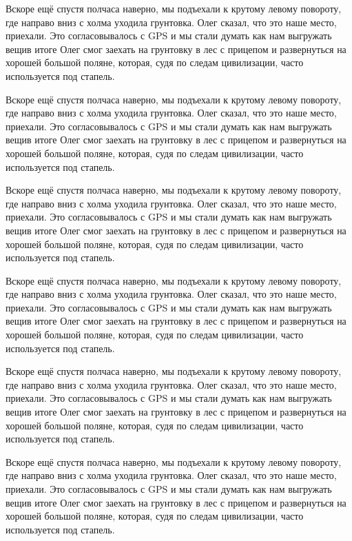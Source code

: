 Вскоре ещё спустя полчаса наверно, мы подъехали к крутому левому повороту, где направо вниз с холма уходила грунтовка. Олег сказал, что это наше место, приехали. Это согласовывалось с GPS и мы стали думать как нам выгружать вещи\mdash в итоге Олег смог заехать на грунтовку в лес с прицепом и развернуться на хорошей большой поляне, которая, судя по следам цивилизации, часто используется под стапель.

Вскоре ещё спустя полчаса наверно, мы подъехали к крутому левому повороту, где направо вниз с холма уходила грунтовка. Олег сказал, что это наше место, приехали. Это согласовывалось с GPS и мы стали думать как нам выгружать вещи\mdash в итоге Олег смог заехать на грунтовку в лес с прицепом и развернуться на хорошей большой поляне, которая, судя по следам цивилизации, часто используется под стапель.

Вскоре ещё спустя полчаса наверно, мы подъехали к крутому левому повороту, где направо вниз с холма уходила грунтовка. Олег сказал, что это наше место, приехали. Это согласовывалось с GPS и мы стали думать как нам выгружать вещи\mdash в итоге Олег смог заехать на грунтовку в лес с прицепом и развернуться на хорошей большой поляне, которая, судя по следам цивилизации, часто используется под стапель.

Вскоре ещё спустя полчаса наверно, мы подъехали к крутому левому повороту, где направо вниз с холма уходила грунтовка. Олег сказал, что это наше место, приехали. Это согласовывалось с GPS и мы стали думать как нам выгружать вещи\mdash в итоге Олег смог заехать на грунтовку в лес с прицепом и развернуться на хорошей большой поляне, которая, судя по следам цивилизации, часто используется под стапель.

Вскоре ещё спустя полчаса наверно, мы подъехали к крутому левому повороту, где направо вниз с холма уходила грунтовка. Олег сказал, что это наше место, приехали. Это согласовывалось с GPS и мы стали думать как нам выгружать вещи\mdash в итоге Олег смог заехать на грунтовку в лес с прицепом и развернуться на хорошей большой поляне, которая, судя по следам цивилизации, часто используется под стапель.

Вскоре ещё спустя полчаса наверно, мы подъехали к крутому левому повороту, где направо вниз с холма уходила грунтовка. Олег сказал, что это наше место, приехали. Это согласовывалось с GPS и мы стали думать как нам выгружать вещи\mdash в итоге Олег смог заехать на грунтовку в лес с прицепом и развернуться на хорошей большой поляне, которая, судя по следам цивилизации, часто используется под стапель.



\begin{center}
\end{center}
